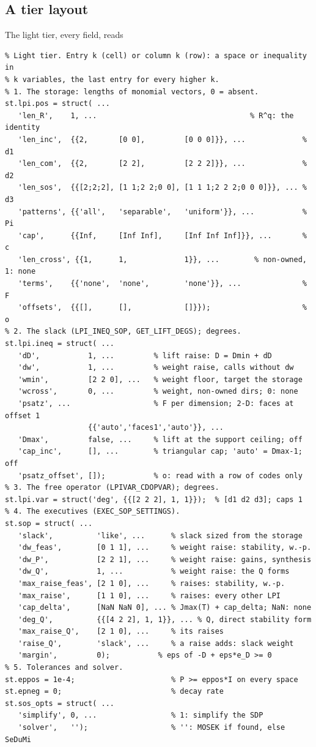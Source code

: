 \subsection{A tier layout}\label{sec:tier-layout}

The light tier, every field, reads
\begin{small}\begin{verbatim}
% Light tier. Entry k (cell) or column k (row): a space or inequality in
% k variables, the last entry for every higher k.
% 1. The storage: lengths of monomial vectors, 0 = absent.
st.lpi.pos = struct( ...
   'len_R',    1, ...                                   % R^q: the identity
   'len_inc',  {{2,       [0 0],         [0 0 0]}}, ...             % d1
   'len_com',  {{2,       [2 2],         [2 2 2]}}, ...             % d2
   'len_sos',  {{[2;2;2], [1 1;2 2;0 0], [1 1 1;2 2 2;0 0 0]}}, ... % d3
   'patterns', {{'all',   'separable',   'uniform'}}, ...           % Pi
   'cap',      {{Inf,     [Inf Inf],     [Inf Inf Inf]}}, ...       % c
   'len_cross', {{1,      1,             1}}, ...        % non-owned, 1: none
   'terms',    {{'none',  'none',        'none'}}, ...              % F
   'offsets',  {{[],      [],            []}});                     % o
% 2. The slack (LPI_INEQ_SOP, GET_LIFT_DEGS); degrees.
st.lpi.ineq = struct( ...
   'dD',           1, ...         % lift raise: D = Dmin + dD
   'dw',           1, ...         % weight raise, calls without dw
   'wmin',         [2 2 0], ...   % weight floor, target the storage
   'wcross',       0, ...         % weight, non-owned dirs; 0: none
   'psatz', ...                   % F per dimension; 2-D: faces at offset 1
                   {{'auto','faces1','auto'}}, ...
   'Dmax',         false, ...     % lift at the support ceiling; off
   'cap_inc',      [], ...        % triangular cap; 'auto' = Dmax-1; off
   'psatz_offset', []);           % o: read with a row of codes only
% 3. The free operator (LPIVAR_CDOPVAR); degrees.
st.lpi.var = struct('deg', {{[2 2 2], 1, 1}});  % [d1 d2 d3]; caps 1
% 4. The executives (EXEC_SOP_SETTINGS).
st.sop = struct( ...
   'slack',          'like', ...      % slack sized from the storage
   'dw_feas',        [0 1 1], ...     % weight raise: stability, w.-p.
   'dw_P',           [2 2 1], ...     % weight raise: gains, synthesis
   'dw_Q',           1, ...           % weight raise: the Q forms
   'max_raise_feas', [2 1 0], ...     % raises: stability, w.-p.
   'max_raise',      [1 1 0], ...     % raises: every other LPI
   'cap_delta',      [NaN NaN 0], ... % Jmax(T) + cap_delta; NaN: none
   'deg_Q',          {{[4 2 2], 1, 1}}, ... % Q, direct stability form
   'max_raise_Q',    [2 1 0], ...     % its raises
   'raise_Q',        'slack', ...     % a raise adds: slack weight
   'margin',         0);           % eps of -D + eps*e_D >= 0
% 5. Tolerances and solver.
st.eppos = 1e-4;                      % P >= eppos*I on every space
st.epneg = 0;                         % decay rate
st.sos_opts = struct( ...
   'simplify', 0, ...                 % 1: simplify the SDP
   'solver',   '');                   % '': MOSEK if found, else SeDuMi
\end{verbatim}\end{small}
